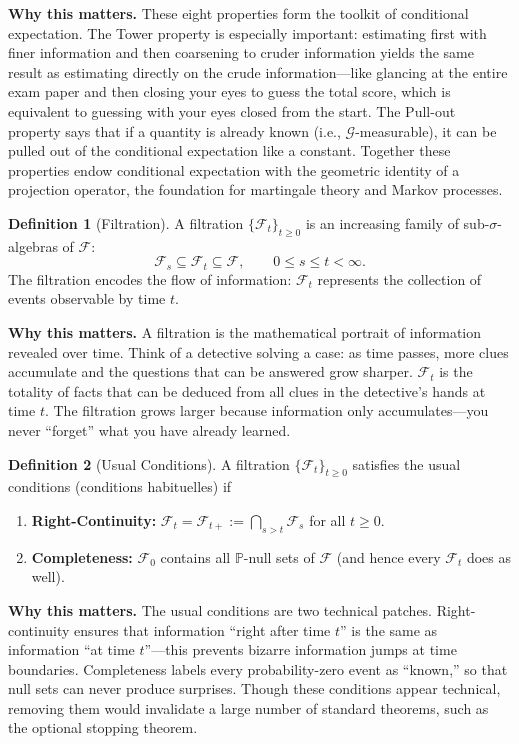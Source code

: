 \documentclass[11pt,a4paper,openany]{book}
\theoremstyle{definition}
\newtheorem{definition}{Definition}[chapter]
\theoremstyle{plain}
\theoremstyle{remark}
\newcommand{\1}{\mathbbm{1}}
\newcommand{\F}{\mathcal{F}}
\newcommand{\Pbb}{\mathbb{P}}
\begin{document}
\medskip
\noindent\textbf{Why this matters.} These eight properties form the toolkit of conditional expectation. The Tower property is especially important: estimating first with finer information and then coarsening to cruder information yields the same result as estimating directly on the crude information---like glancing at the entire exam paper and then closing your eyes to guess the total score, which is equivalent to guessing with your eyes closed from the start. The Pull-out property says that if a quantity is already known (i.e., $\mathcal{G}$-measurable), it can be pulled out of the conditional expectation like a constant. Together these properties endow conditional expectation with the geometric identity of a projection operator, the foundation for martingale theory and Markov processes.

\begin{definition}[Filtration]
A filtration $\{\F_{t}\}_{t \geq 0}$ is an increasing family of sub-$\sigma$-algebras of $\F$:
\[
\F_{s} \subseteq \F_{t} \subseteq \F, \qquad 0 \leq s \leq t < \infty.
\]
The filtration encodes the flow of information: $\F_{t}$ represents the collection of events observable by time $t$.
\end{definition}

\medskip
\noindent\textbf{Why this matters.} A filtration is the mathematical portrait of information revealed over time. Think of a detective solving a case: as time passes, more clues accumulate and the questions that can be answered grow sharper. $\mathcal{F}_t$ is the totality of facts that can be deduced from all clues in the detective's hands at time $t$. The filtration grows larger because information only accumulates---you never ``forget'' what you have already learned.

\begin{definition}[Usual Conditions]
A filtration $\{\F_{t}\}_{t \geq 0}$ satisfies the usual conditions (conditions habituelles) if
\begin{enumerate}[label=(\arabic*)]
    \item \textbf{Right-Continuity:} $\F_{t} = \F_{t+} := \bigcap_{s > t} \F_{s}$ for all $t \geq 0$.
    \item \textbf{Completeness:} $\F_{0}$ contains all $\Pbb$-null sets of $\F$ (and hence every $\F_{t}$ does as well).
\end{enumerate}
\end{definition}

\medskip
\noindent\textbf{Why this matters.} The usual conditions are two technical patches. Right-continuity ensures that information ``right after time $t$'' is the same as information ``at time $t$''---this prevents bizarre information jumps at time boundaries. Completeness labels every probability-zero event as ``known,'' so that null sets can never produce surprises. Though these conditions appear technical, removing them would invalidate a large number of standard theorems, such as the optional stopping theorem.
\end{document}
